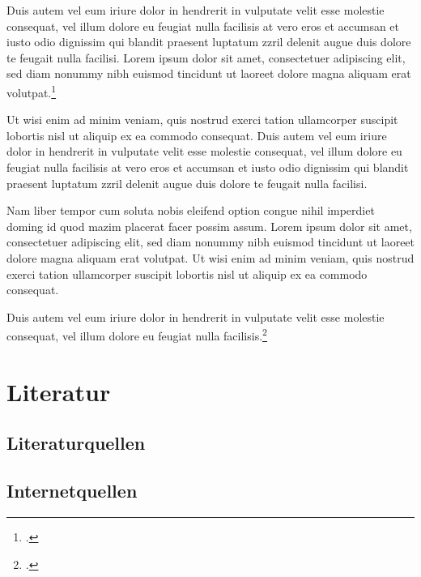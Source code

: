 \documentclass[11pt, a4paper]{article}
\begin{document}
    Duis autem vel eum iriure dolor in hendrerit in vulputate velit esse molestie consequat, vel illum dolore eu feugiat nulla facilisis at vero eros et accumsan et iusto odio dignissim qui blandit praesent luptatum zzril delenit augue duis dolore te feugait nulla facilisi. Lorem ipsum dolor sit amet, consectetuer adipiscing elit, sed diam nonummy nibh euismod tincidunt ut laoreet dolore magna aliquam erat volutpat.\footcite[vgl.][https://google.com..., abgerufen am 20.01.2020]{test}

    Ut wisi enim ad minim veniam, quis nostrud exerci tation ullamcorper suscipit lobortis nisl ut aliquip ex ea commodo consequat. Duis autem vel eum iriure dolor in hendrerit in vulputate velit esse molestie consequat, vel illum dolore eu feugiat nulla facilisis at vero eros et accumsan et iusto odio dignissim qui blandit praesent luptatum zzril delenit augue duis dolore te feugait nulla facilisi. 

    Nam liber tempor cum soluta nobis eleifend option congue nihil imperdiet doming id quod mazim placerat facer possim assum. Lorem ipsum dolor sit amet, consectetuer adipiscing elit, sed diam nonummy nibh euismod tincidunt ut laoreet dolore magna aliquam erat volutpat. Ut wisi enim ad minim veniam, quis nostrud exerci tation ullamcorper suscipit lobortis nisl ut aliquip ex ea commodo consequat. 

    Duis autem vel eum iriure dolor in hendrerit in vulputate velit esse molestie consequat, vel illum dolore eu feugiat nulla facilisis.\footcite[vgl.][S. 21]{mustermann}
    \cleardoublepage

    \section*{Literatur}

    \subsection*{Literaturquellen}
    \printbibliography[type=book, heading=none]

    \subsection*{Internetquellen}
    \printbibliography[type=misc, heading=none]

    

    
\end{document}
